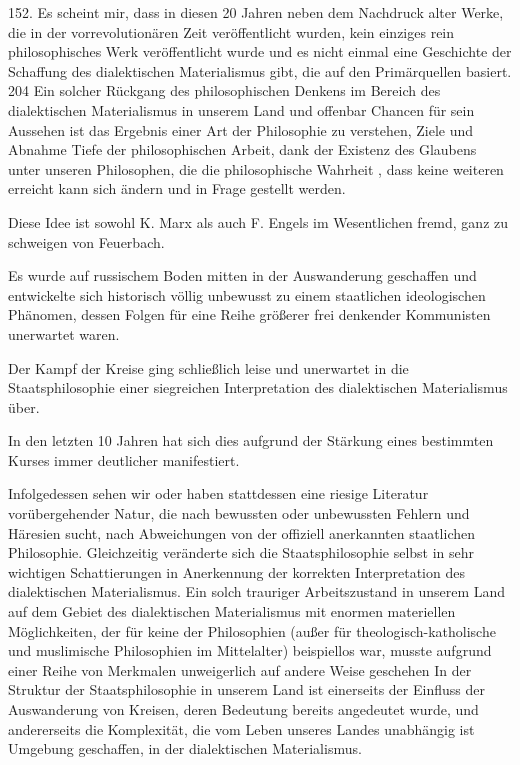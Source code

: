 \documentclass[11pt,a4paper]{book}
\begin{document}
152. Es scheint mir, dass in diesen 20 Jahren neben dem Nachdruck alter Werke, die in der vorrevolutionären Zeit veröffentlicht wurden, kein einziges rein philosophisches Werk veröffentlicht wurde und es nicht einmal eine Geschichte der Schaffung des dialektischen Materialismus gibt, die auf den Primärquellen basiert. 204 Ein solcher Rückgang des philosophischen Denkens im Bereich des dialektischen Materialismus in unserem Land und offenbar Chancen für sein Aussehen ist das Ergebnis einer Art der Philosophie zu verstehen, Ziele und Abnahme Tiefe der philosophischen Arbeit, dank der Existenz des Glaubens unter unseren Philosophen, die die philosophische Wahrheit , dass keine weiteren erreicht kann sich ändern und in Frage gestellt werden.



Diese Idee ist sowohl K. Marx als auch F. Engels im Wesentlichen fremd, ganz zu schweigen von Feuerbach.



Es wurde auf russischem Boden mitten in der Auswanderung geschaffen und entwickelte sich historisch völlig unbewusst zu einem staatlichen ideologischen Phänomen, dessen Folgen für eine Reihe größerer frei denkender Kommunisten unerwartet waren.



Der Kampf der Kreise ging schließlich leise und unerwartet in die Staatsphilosophie einer siegreichen Interpretation des dialektischen Materialismus über.



In den letzten 10 Jahren hat sich dies aufgrund der Stärkung eines bestimmten Kurses immer deutlicher manifestiert.



Infolgedessen sehen wir oder haben stattdessen eine riesige Literatur vorübergehender Natur, die nach bewussten oder unbewussten Fehlern und Häresien sucht, nach Abweichungen von der offiziell anerkannten staatlichen Philosophie. Gleichzeitig veränderte sich die Staatsphilosophie selbst in sehr wichtigen Schattierungen in Anerkennung der korrekten Interpretation des dialektischen Materialismus. Ein solch trauriger Arbeitszustand in unserem Land auf dem Gebiet des dialektischen Materialismus mit enormen materiellen Möglichkeiten, der für keine der Philosophien (außer für theologisch-katholische und muslimische Philosophien im Mittelalter) beispiellos war, musste aufgrund einer Reihe von Merkmalen unweigerlich auf andere Weise geschehen In der Struktur der Staatsphilosophie in unserem Land ist einerseits der Einfluss der Auswanderung von Kreisen, deren Bedeutung bereits angedeutet wurde, und andererseits die Komplexität, die vom Leben unseres Landes unabhängig ist Umgebung geschaffen, in der dialektischen Materialismus.
\end{document}
